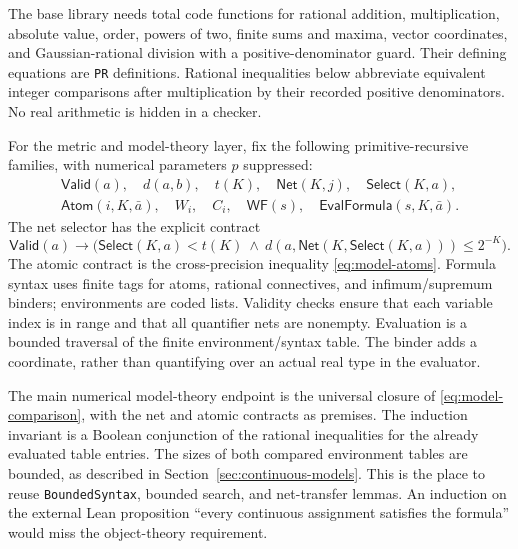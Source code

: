 The base library needs total code functions for rational addition, multiplication,
absolute value, order, powers of two, finite sums and maxima, vector coordinates,
and Gaussian-rational division with a positive-denominator guard. Their defining
equations are \texttt{PR} definitions. Rational inequalities below abbreviate
equivalent integer comparisons after multiplication by their recorded positive
denominators. No real arithmetic is hidden in a checker.

For the metric and model-theory layer, fix the following primitive-recursive
families, with numerical parameters $p$ suppressed:
\[
\begin{gathered}
 \mathsf{Valid}(a),\quad d(a,b),\quad
 t(K),\quad \mathsf{Net}(K,j),\quad \mathsf{Select}(K,a),\\
 \mathsf{Atom}(i,K,\bar a),\quad W_i,\quad C_i,\quad
 \mathsf{WF}(s),\quad \mathsf{EvalFormula}(s,K,\bar a).
\end{gathered}
\]
The net selector has the explicit contract
\[
 \mathsf{Valid}(a)\to
 \bigl(\mathsf{Select}(K,a)<t(K)\ \land\
 d(a,\mathsf{Net}(K,\mathsf{Select}(K,a)))\le2^{-K}\bigr).
\]
The atomic contract is the cross-precision inequality
\eqref{eq:model-atoms}. Formula syntax uses finite tags for atoms, rational
connectives, and infimum/supremum binders; environments are coded lists.
Validity checks ensure that each variable index is in range and that all
quantifier nets are nonempty. Evaluation is a bounded traversal of the
finite environment/syntax table. The binder adds a coordinate, rather than
quantifying over an actual real type in the evaluator.

The main numerical model-theory endpoint is the universal closure of
\eqref{eq:model-comparison}, with the net and atomic contracts as premises.
The induction invariant is a Boolean conjunction of the rational inequalities
for the already evaluated table entries. The sizes of both compared
environment tables are bounded, as described in
Section~\ref{sec:continuous-models}. This is the place to reuse
\texttt{BoundedSyntax}, bounded search, and net-transfer lemmas. An induction
on the external Lean proposition ``every continuous assignment satisfies the
formula'' would miss the object-theory requirement.


